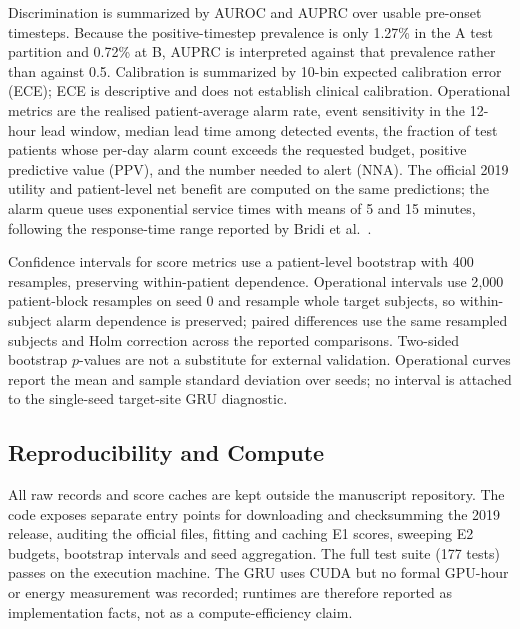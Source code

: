 Discrimination is summarized by AUROC and AUPRC over usable pre-onset timesteps. Because the positive-timestep prevalence is only 1.27\% in the A test partition and 0.72\% at B, AUPRC is interpreted against that prevalence rather than against 0.5. Calibration is summarized by 10-bin expected calibration error (ECE); ECE is descriptive and does not establish clinical calibration. Operational metrics are the realised patient-average alarm rate, event sensitivity in the 12-hour lead window, median lead time among detected events, the fraction of test patients whose per-day alarm count exceeds the requested budget, positive predictive value (PPV), and the number needed to alert (NNA). The official 2019 utility and patient-level net benefit are computed on the same predictions; the alarm queue uses exponential service times with means of 5 and 15 minutes, following the response-time range reported by Bridi et al.\ \citep{bridi2014reaction}.

Confidence intervals for score metrics use a patient-level bootstrap with 400 resamples, preserving within-patient dependence. Operational intervals use 2{,}000 patient-block resamples on seed 0 and resample whole target subjects, so within-subject alarm dependence is preserved; paired differences use the same resampled subjects and Holm correction across the reported comparisons. Two-sided bootstrap $p$-values are not a substitute for external validation. Operational curves report the mean and sample standard deviation over seeds; no interval is attached to the single-seed target-site GRU diagnostic.

\subsection{Reproducibility and Compute}

All raw records and score caches are kept outside the manuscript repository. The code exposes separate entry points for downloading and checksumming the 2019 release, auditing the official files, fitting and caching E1 scores, sweeping E2 budgets, bootstrap intervals and seed aggregation. The full test suite (177 tests) passes on the execution machine. The GRU uses CUDA but no formal GPU-hour or energy measurement was recorded; runtimes are therefore reported as implementation facts, not as a compute-efficiency claim.

